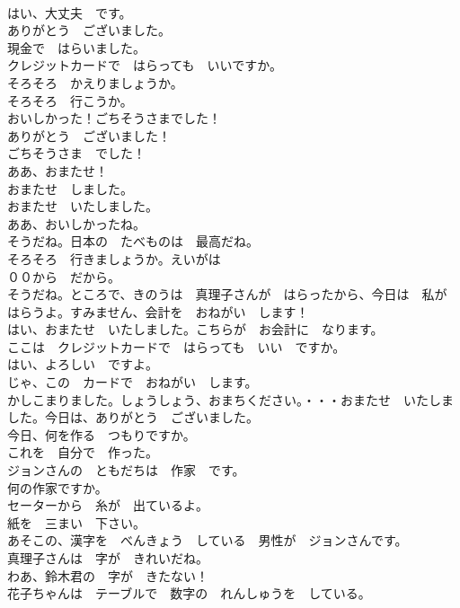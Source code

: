 \documentclass[8pt]{extreport}
\begin{document}
\begin{CJK}{UTF8}{min}
\\	はい、大丈夫　です。	
\\	ありがとう　ございました。	
\\	現金で　はらいました。	
\\	クレジットカードで　はらっても　いいですか。	
\\	そろそろ　かえりましょうか。	
\\	そろそろ　行こうか。	
\\	おいしかった！ごちそうさまでした！	
\\	ありがとう　ございました！	
\\	ごちそうさま　でした！	
\\	ああ、おまたせ！	
\\	おまたせ　しました。	
\\	おまたせ　いたしました。	
\\	ああ、おいしかったね。	
\\	そうだね。日本の　たべものは　最高だね。	
\\	そろそろ　行きましょうか。えいがは　
\\	００から　だから。	
\\	そうだね。ところで、きのうは　真理子さんが　はらったから、今日は　私が　はらうよ。すみません、会計を　おねがい　します！	
\\	はい、おまたせ　いたしました。こちらが　お会計に　なります。	
\\	ここは　クレジットカードで　はらっても　いい　ですか。	
\\	はい、よろしい　ですよ。	
\\	じゃ、この　カードで　おねがい　します。	
\\	かしこまりました。しょうしょう、おまちください。・・・おまたせ　いたしました。今日は、ありがとう　ございました。	
\\	今日、何を作る　つもりですか。	
\\	これを　自分で　作った。	
\\	ジョンさんの　ともだちは　作家　です。	
\\	何の作家ですか。	
\\	セーターから　糸が　出ているよ。	
\\	紙を　三まい　下さい。	
\\	あそこの、漢字を　べんきょう　している　男性が　ジョンさんです。	
\\	真理子さんは　字が　きれいだね。	
\\	わあ、鈴木君の　字が　きたない！	
\\	花子ちゃんは　テーブルで　数字の　れんしゅうを　している。	

\end{CJK}
\end{document}
